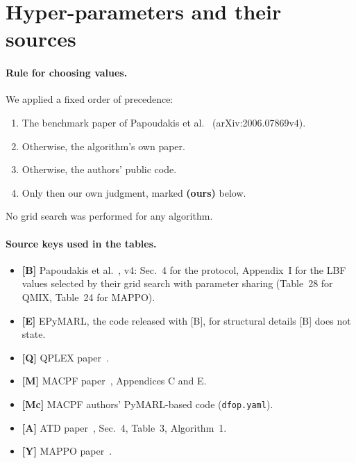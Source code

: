 \section{Hyper-parameters and their sources}
\label{app:hyper}

\paragraph{Rule for choosing values.} We applied a fixed order of precedence:
\begin{enumerate}
  \item The benchmark paper of Papoudakis et al.~\citep{test} (arXiv:2006.07869v4).
  \item Otherwise, the algorithm's own paper.
  \item Otherwise, the authors' public code.
  \item Only then our own judgment, marked \textbf{(ours)} below.
\end{enumerate}
No grid search was performed for any algorithm.

\paragraph{Source keys used in the tables.}
\begin{itemize}
  \item \textbf{[B]} Papoudakis et al.~\citep{test}, v4: Sec.~4 for the protocol, Appendix~I for
        the LBF values selected by their grid search with parameter sharing (Table~28 for QMIX,
        Table~24 for MAPPO).
  \item \textbf{[E]} EPyMARL, the code released with [B], for structural details [B] does not
        state.
  \item \textbf{[Q]} QPLEX paper~\citep{wang2021qplex}.
  \item \textbf{[M]} MACPF paper~\citep{macpf}, Appendices C and E.
  \item \textbf{[Mc]} MACPF authors' PyMARL-based code (\texttt{dfop.yaml}).
  \item \textbf{[A]} ATD paper~\citep{deng2026adaptive}, Sec.~4, Table~3, Algorithm~1.
  \item \textbf{[Y]} MAPPO paper~\citep{yu2022mappo}.
\end{itemize}

